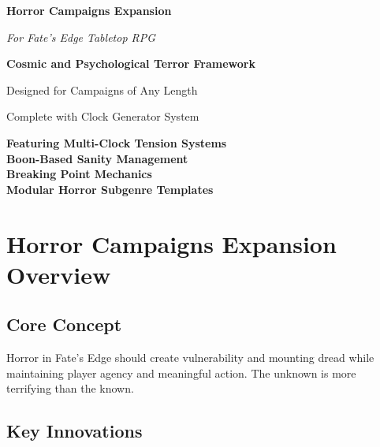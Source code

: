 \documentclass[11pt]{article}
\begin{document}
\begin{titlepage}
\centering
\vspace*{2cm}

{\Huge\bfseries\color{headercolor} Horror Campaigns Expansion} 

\vspace{0.5cm}

{\Large\itshape For Fate's Edge Tabletop RPG}

\vspace{2cm}

\vspace{2cm}

{\Large\bfseries Cosmic and Psychological Terror Framework}

\vspace{1cm}

{\large Designed for Campaigns of Any Length}

\vspace{1cm}

{\large Complete with Clock Generator System}

\vfill

{\large 
\textbf{Featuring Multi-Clock Tension Systems} \\
\textbf{Boon-Based Sanity Management} \\
\textbf{Breaking Point Mechanics} \\
\textbf{Modular Horror Subgenre Templates}
}

\end{titlepage}

\newpage

\tableofcontents

\newpage

\section{Horror Campaigns Expansion Overview}

\subsection{Core Concept}

Horror in Fate's Edge should create vulnerability and mounting dread while maintaining player agency and meaningful action. The unknown is more terrifying than the known.

\subsection{Key Innovations}
\end{document}
